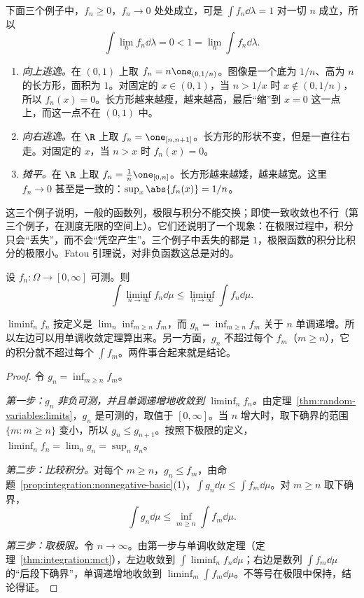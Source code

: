 \begin{example}[质量的三种逃逸方式]\label{ex:integration:escape}
下面三个例子中，$f_n\geqslant0$，$f_n\to0$ 处处成立，可是 $\int f_n\dd\lambda=1$ 对一切 $n$ 成立，所以
\[
\int\lim_nf_n\dd\lambda=0<1=\lim_n\int f_n\dd\lambda .
\]
\begin{enumerate}
\item \emph{向上逃逸。}在 $(0,1)$ 上取 $f_n=n\one_{(0,1/n)}$。图像是一个底为 $1/n$、高为 $n$ 的长方形，面积为 $1$。对固定的 $x\in(0,1)$，当 $n>1/x$ 时 $x\notin(0,1/n)$，所以 $f_n(x)=0$。长方形越来越瘦，越来越高，最后“缩”到 $x=0$ 这一点上，而这一点不在 $(0,1)$ 中。
\item \emph{向右逃逸。}在 $\R$ 上取 $f_n=\one_{[n,n+1]}$。长方形的形状不变，但是一直往右走。对固定的 $x$，当 $n>x$ 时 $f_n(x)=0$。
\item \emph{摊平。}在 $\R$ 上取 $f_n=\frac1n\one_{[0,n]}$。长方形越来越矮，越来越宽。这里 $f_n\to0$ 甚至是一致的：$\sup_x\abs{f_n(x)}=1/n$。
\end{enumerate}
这三个例子说明，一般的函数列，极限与积分不能交换；即使一致收敛也不行（第三个例子，在测度无限的空间上）。它们还说明了一个现象：在极限过程中，积分只会“丢失”，而不会“凭空产生”。三个例子中丢失的都是 $1$，极限函数的积分比积分的极限小。Fatou 引理说，对非负函数这总是对的。
\end{example}

\begin{theorem}[Fatou 引理]\label{thm:integration:fatou}
设 $f_n:\Omega\to[0,\infty]$ 可测。则
\[
\int\liminf_{n\to\infty}f_n\dd\mu\leqslant\liminf_{n\to\infty}\int f_n\dd\mu .
\]
\end{theorem}

\begin{remark}[证明思路]
$\liminf_nf_n$ 按定义是 $\lim_n\inf_{m\geqslant n}f_m$，而 $g_n=\inf_{m\geqslant n}f_m$ 关于 $n$ 单调递增。所以左边可以用单调收敛定理算出来。另一方面，$g_n$ 不超过每个 $f_m$（$m\geqslant n$），它的积分就不超过每个 $\int f_m$。两件事合起来就是结论。
\end{remark}

\begin{proof}
令 $g_n=\inf_{m\geqslant n}f_m$。

\emph{第一步：$g_n$ 非负可测，并且单调递增地收敛到 $\liminf_nf_n$。}由定理~\ref{thm:random-variables:limits}，$g_n$ 是可测的，取值于 $[0,\infty]$。当 $n$ 增大时，取下确界的范围 $\{m:m\geqslant n\}$ 变小，所以 $g_n\leqslant g_{n+1}$。按照下极限的定义，$\liminf_nf_n=\lim_ng_n=\sup_ng_n$。

\emph{第二步：比较积分。}对每个 $m\geqslant n$，$g_n\leqslant f_m$，由命题~\ref{prop:integration:nonnegative-basic}(1)，$\int g_n\dd\mu\leqslant\int f_m\dd\mu$。对 $m\geqslant n$ 取下确界，
\[
\int g_n\dd\mu\leqslant\inf_{m\geqslant n}\int f_m\dd\mu .
\]

\emph{第三步：取极限。}令 $n\to\infty$。由第一步与单调收敛定理（定理~\ref{thm:integration:mct}），左边收敛到 $\int\liminf_nf_n\dd\mu$；右边是数列 $\int f_m\dd\mu$ 的“后段下确界”，单调递增地收敛到 $\liminf_m\int f_m\dd\mu$。不等号在极限中保持，结论得证。
\end{proof}

